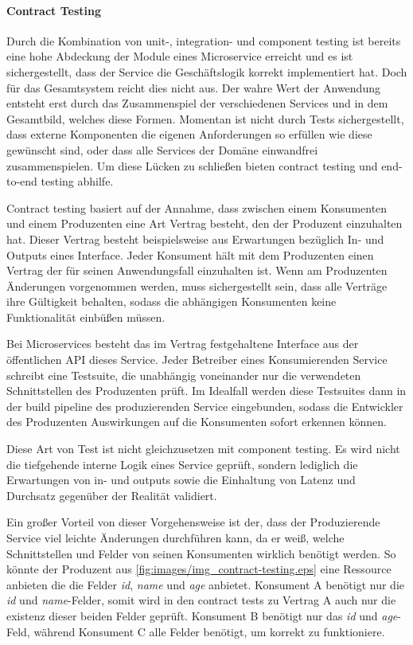 \documentclass[12pt,a4paper,bibliography=totocnumbered,listof=totocnumbered]{scrartcl}
\begin{document}
\paragraph{Contract Testing}

Durch die Kombination von unit-, integration- und component testing ist bereits eine hohe Abdeckung der Module eines Microservice erreicht und es ist sichergestellt, dass der Service die Geschäftslogik korrekt implementiert hat. Doch für das Gesamtsystem reicht dies nicht aus. Der wahre Wert der Anwendung entsteht erst durch das Zusammenspiel der verschiedenen Services und in dem Gesamtbild, welches diese Formen. Momentan ist nicht durch Tests sichergestellt, dass externe Komponenten die eigenen Anforderungen so erfüllen wie diese gewünscht sind, oder dass alle Services der Domäne einwandfrei zusammenspielen.\cite{clemson} Um diese Lücken zu schließen bieten contract testing und end-to-end testing abhilfe.

Contract testing basiert auf der Annahme, dass zwischen einem Konsumenten und einem Produzenten eine Art Vertrag besteht, den der Produzent einzuhalten hat. Dieser Vertrag besteht beispielsweise aus Erwartungen bezüglich In- und Outputs eines Interface. Jeder Konsument hält mit dem Produzenten einen Vertrag der für seinen Anwendungsfall einzuhalten ist. Wenn am Produzenten Änderungen vorgenommen werden, muss sichergestellt sein, dass alle Verträge ihre Gültigkeit behalten, sodass die abhängigen Konsumenten keine Funktionalität einbüßen müssen.\cite{clemson}

Bei Microservices besteht das im Vertrag festgehaltene Interface aus der öffentlichen \ac{API} dieses Service. Jeder Betreiber eines Konsumierenden Service schreibt eine Testsuite, die unabhängig voneinander nur die verwendeten Schnittstellen des Produzenten prüft. Im Idealfall werden diese Testsuites dann in der build pipeline des produzierenden Service eingebunden, sodass die Entwickler des Produzenten Auswirkungen auf die Konsumenten sofort erkennen können.\cite{clemson}

Diese Art von Test ist nicht gleichzusetzen mit component testing. Es wird nicht die tiefgehende interne Logik eines Service geprüft, sondern lediglich die Erwartungen von in- und outputs sowie die Einhaltung von Latenz und Durchsatz gegenüber der Realität validiert.\cite{clemson}


Ein großer Vorteil von dieser Vorgehensweise ist der, dass der Produzierende Service viel leichte Änderungen durchführen kann, da er weiß, welche Schnittstellen und Felder von seinen Konsumenten wirklich benötigt werden. So könnte der Produzent aus \ref{fig:images/img_contract-testing.eps} eine Ressource anbieten die die Felder \textit{id}, \textit{name} und \textit{age} anbietet. Konsument A benötigt nur die \textit{id} und \textit{name}-Felder, somit wird in den contract tests zu Vertrag A auch nur die existenz dieser beiden Felder geprüft. Konsument B benötigt nur das \textit{id} und \textit{age}-Feld, während Konsument C alle Felder benötigt, um korrekt zu funktioniere.\cite{clemson}
\end{document}
